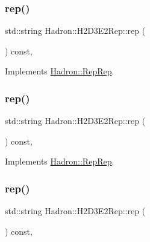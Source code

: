 \subsubsection{\texorpdfstring{rep()}{rep()}\hspace{0.1cm}{\footnotesize\ttfamily [2/5]}}
{\footnotesize\ttfamily std\+::string Hadron\+::\+H2\+D3\+E2\+Rep\+::rep (\begin{DoxyParamCaption}{ }\end{DoxyParamCaption}) const\hspace{0.3cm}{\ttfamily [inline]}, {\ttfamily [virtual]}}



Implements \mbox{\hyperlink{structHadron_1_1RepRep_ab3213025f6de249f7095892109575fde}{Hadron\+::\+Rep\+Rep}}.

\mbox{\label{structHadron_1_1H2D3E2Rep_a1e87b376344ff9529dd7f69395f739fa}} 
\subsubsection{\texorpdfstring{rep()}{rep()}\hspace{0.1cm}{\footnotesize\ttfamily [3/5]}}
{\footnotesize\ttfamily std\+::string Hadron\+::\+H2\+D3\+E2\+Rep\+::rep (\begin{DoxyParamCaption}{ }\end{DoxyParamCaption}) const\hspace{0.3cm}{\ttfamily [inline]}, {\ttfamily [virtual]}}



Implements \mbox{\hyperlink{structHadron_1_1RepRep_ab3213025f6de249f7095892109575fde}{Hadron\+::\+Rep\+Rep}}.

\mbox{\label{structHadron_1_1H2D3E2Rep_a1e87b376344ff9529dd7f69395f739fa}} 
\subsubsection{\texorpdfstring{rep()}{rep()}\hspace{0.1cm}{\footnotesize\ttfamily [4/5]}}
{\footnotesize\ttfamily std\+::string Hadron\+::\+H2\+D3\+E2\+Rep\+::rep (\begin{DoxyParamCaption}{ }\end{DoxyParamCaption}) const\hspace{0.3cm}{\ttfamily [inline]}, {\ttfamily [virtual]}}



